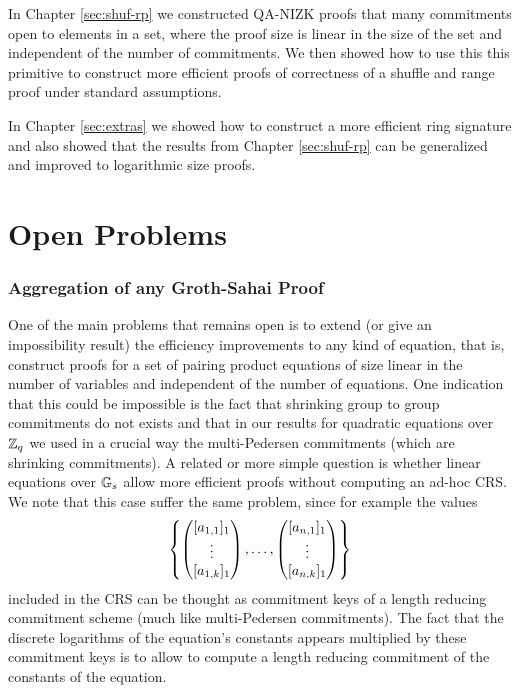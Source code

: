 In Chapter \ref{sec:shuf-rp} we constructed QA-NIZK proofs that many commitments open to elements in a set, where the proof size is linear in the size of the set and independent of the number of commitments. We then showed how to use this this primitive to construct more efficient proofs of correctness of a shuffle and range proof under standard assumptions.

In Chapter \ref{sec:extras} we showed how to construct a more efficient ring signature and also showed that the results from Chapter \ref{sec:shuf-rp} can be generalized and improved to logarithmic size proofs.

\section{Open Problems}

\subsubsection{Aggregation of any Groth-Sahai Proof}
One of the main problems that remains open is to extend (or give an impossibility result) the efficiency improvements to any kind of equation, that is, construct proofs for a set of pairing product equations of size linear in the number of variables and independent of the number of equations. One indication that this could be impossible is the fact that shrinking group to group commitments do not exists \cite{EC:AbeHarOhk12} and that in our results for quadratic equations over $\mathbb{Z}_q$ we used in a crucial way the multi-Pedersen commitments (which are shrinking commitments). A related or more simple question is whether linear equations over $\mathbb{G}_s$ allow more efficient proofs without computing an ad-hoc CRS. We note that this case suffer the same problem, since for example the values 
$$\left\{\left(\begin{matrix}{[a_{1,1}]_1}\\\vdots\\{[a_{1,k}]_1}\end{matrix}\right),\ldots,\left(\begin{matrix}{[a_{n,1}]_1}\\\vdots\\{[a_{n,k}]_1}\end{matrix}\right)\right\}$$
included in the CRS can be thought as commitment keys of a length reducing commitment scheme (much like multi-Pedersen commitments). The fact that the discrete logarithms of the equation's constants appears multiplied by these commitment keys is to allow to compute a length reducing commitment of the constants of the equation.

